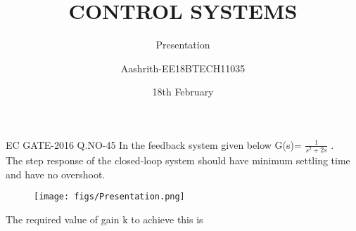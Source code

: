 \documentclass{beamer}
\title{CONTROL SYSTEMS}
\subtitle{Presentation}
\author{Aashrith-EE18BTECH11035}
\date{18th February}
\begin{document}
\begin{frame}
\titlepage    
\end{frame}


\begin{frame}{EC GATE-2016 Q.NO-45 }
In the feedback system given below G(s)= \(\frac{1}{s^2+2s}\) .\\
The step response of the closed-loop system should have minimum settling time and have no overshoot.

\begin{figure}
    \texttt{[image: figs/Presentation.png]}
\end{figure}

The required value of gain k to achieve this is \underline{\hspace{2cm}}

\end{frame}
\end{document}
